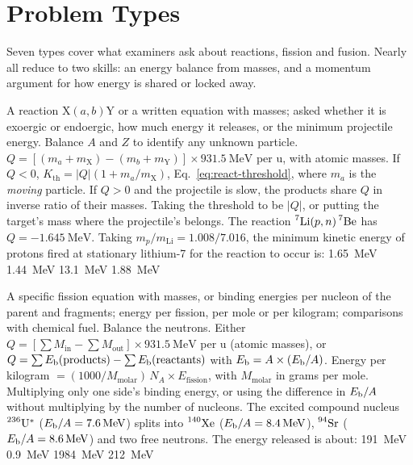 \section{Problem Types}\label{sec:react-types}
Seven types cover what examiners ask about reactions, fission and fusion. Nearly all reduce to two
skills: an energy balance from masses, and a momentum argument for how energy is shared or locked away.

{A reaction $\mathrm X(a,b)\mathrm Y$ or a written equation with masses; asked whether it is exoergic or
endoergic, how much energy it releases, or the minimum projectile energy.}
{Balance $A$ and $Z$ to identify any unknown particle. $Q=[(m_a+m_{\mathrm X})-(m_b+m_{\mathrm Y})]\times
\SI{931.5}{\MeV}$ per \si{\amu}, with atomic masses. If $Q<0$, $K_{\text{th}}=|Q|(1+m_a/m_{\mathrm X})$,
Eq.~\eqref{eq:react-threshold}, where $m_a$ is the \emph{moving} particle. If $Q>0$ and the projectile
is slow, the products share $Q$ in inverse ratio of their masses.}
{Taking the threshold to be $|Q|$, or putting the target's mass where the projectile's belongs.}
{The reaction $\prescript{7}{}{\mathrm{Li}}(p,n)\prescript{7}{}{\mathrm{Be}}$ has $Q=-\SI{1.645}{\MeV}$. Taking
$m_p/m_{\mathrm{Li}}=1.008/7.016$, the minimum kinetic energy of protons fired at stationary lithium-7 for
the reaction to occur is:}
{\SI{1.65}{\MeV}}
{\SI{1.44}{\MeV}}
{\SI{13.1}{\MeV}}
{\SI{1.88}{\MeV}}

{A specific fission equation with masses, or binding energies per nucleon of the parent and fragments;
energy per fission, per mole or per kilogram; comparisons with chemical fuel.}
{Balance the neutrons. Either $Q=[\sum M_{\text{in}}-\sum M_{\text{out}}]\times\SI{931.5}{\MeV}$ per
\si{\amu} (atomic masses), or $Q=\sum E_{\mathrm{b}}(\text{products})-\sum E_{\mathrm{b}}(\text{reactants})$ with
$E_{\mathrm{b}}=A\times(E_{\mathrm{b}}/A)$. Energy per kilogram $=(1000/M_{\text{molar}})\,N_A\times E_{\text{fission}}$, with
$M_{\text{molar}}$ in grams per mole.}
{Multiplying only one side's binding energy, or using the difference in $E_{\mathrm{b}}/A$ without multiplying by the
number of nucleons.}
{The excited compound nucleus $\prescript{236}{}{\mathrm{U}}^*$ ($\Eb/A=\SI{7.6}{\MeV}$) splits into $\prescript{140}{}{\mathrm{Xe}}$
($\Eb/A=\SI{8.4}{\MeV}$), $\prescript{94}{}{\mathrm{Sr}}$ ($\Eb/A=\SI{8.6}{\MeV}$) and two free neutrons. The energy
released is about:}
{\SI{191}{\MeV}}
{\SI{0.9}{\MeV}}
{\SI{1984}{\MeV}}
{\SI{212}{\MeV}}

